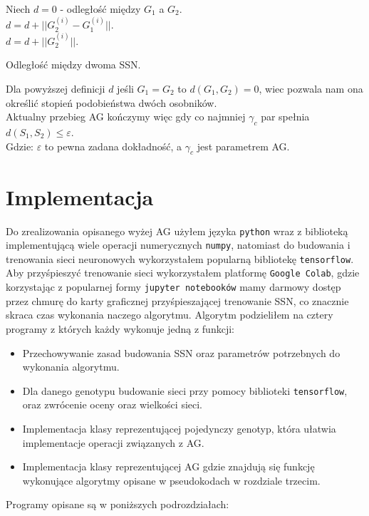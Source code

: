 \documentclass{article}
\begin{document}
\begin{algorithm}[H]
	Niech $d = 0$ - odległość między $G_1$ a $G_2$.\\
	 {
		$d = d + ||G_2^{(i)} - G_1^{(i)}||$.\\
	}
	 {
		$d = d + ||G_2^{(i)}||$.\\
	}
	\caption{Odległość między dwoma SSN.}
\end{algorithm}

Dla powyższej definicji $d$ jeśli $G_1 = G_2$ to $d(G_1, G_2) = 0$, wiec pozwala nam ona określić
stopień podobieństwa dwóch osobników.\\
Aktualny przebieg AG kończymy więc gdy co najmniej $\gamma_c$ par spełnia 
$d(S_1, S_2) \leq \varepsilon$.\\
Gdzie: $\varepsilon$ to pewna zadana dokładność, a $\gamma_c$ jest parametrem AG.


\section{Implementacja}
\label{sec:imp}
Do zrealizowania opisanego wyżej AG użyłem języka \texttt{python}\cite{python} wraz z 
biblioteką  implementującą wiele operacji numerycznych \texttt{numpy}\cite{np},
natomiast do budowania i trenowania
sieci neuronowych wykorzystałem popularną bibliotekę \texttt{tensorflow}\cite{tf}.
Aby przyśpieszyć trenowanie sieci wykorzystałem platformę \texttt{Google Colab}\cite{colab},
gdzie korzystając z popularnej formy \texttt{jupyter notebooków}\cite{jp} mamy darmowy dostęp
przez chmurę do karty graficznej przyśpieszającej trenowanie SSN,
co znacznie skraca czas wykonania naczego algorytmu.
Algorytm podzieliłem na cztery programy z których każdy wykonuje jedną z funkcji:
\begin{itemize}
\item Przechowywanie zasad budowania SSN oraz parametrów potrzebnych do wykonania algorytmu.
\item Dla danego genotypu budowanie sieci przy pomocy biblioteki \texttt{tensorflow}, oraz
zwrócenie oceny oraz wielkości sieci.
\item Implementacja klasy reprezentującej pojedynczy genotyp, która ułatwia implementacje
operacji związanych z AG.
\item Implementacja klasy reprezentującej AG gdzie znajdują się funkcję wykonujące algorytmy
opisane w pseudokodach w rozdziale trzecim.
\end{itemize}
Programy opisane są w poniższych podrozdziałach:\\
\end{document}
